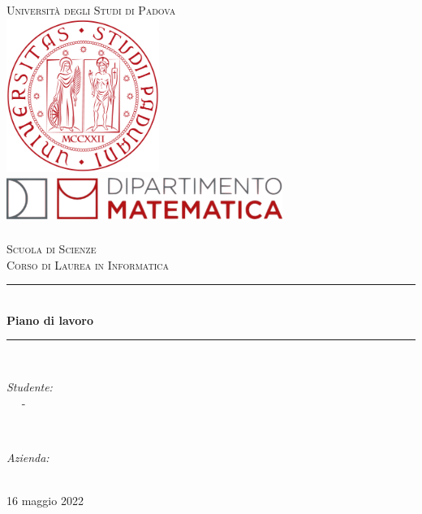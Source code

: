 \begin{titlepage}
    \newcommand{\HRule}{\rule{\linewidth}{0.5mm}}
    \center
    \textsc{\LARGE Università degli Studi di Padova}\\[1cm]
    \includegraphics[height=5cm]{img/UniPd.png}\\[1cm]
    \includegraphics[height=1.5cm, width = 9cm]{img/MathDip.png}\\
    \textsc{\dipartimento}\\[1.2cm]
    \textsc{\Large Scuola di Scienze}\\[0.5cm] 
    \textsc{\large Corso di Laurea in Informatica}\\[0.5cm] 
    \vspace{2.5cm}
    \HRule \\[0.4cm]
    { \huge \bfseries Piano di lavoro}\\[0.4cm]
    \HRule \\[1.5cm]
    \vspace{1.5cm}
    \begin{minipage}{0.4\textwidth}
        \begin{flushleft} \large
            \emph{Studente:}\\
            \nomeStudente\ \textsc{\cognomeStudente\ } - \matricolaStudente
        \end{flushleft}
    \end{minipage}
    ~
    \begin{minipage}{0.4\textwidth}
        \begin{flushright} \large
            \emph{Azienda:} \\
            \ragioneSocAzienda
        \end{flushright}
    \end{minipage}\\[2cm]
    {\large 16 maggio 2022}\\[2cm]
    \vfill
\end{titlepage}